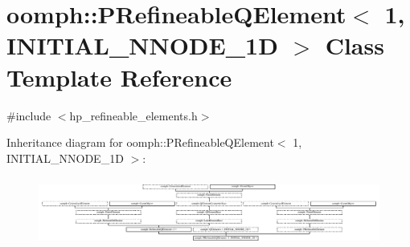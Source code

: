 \hypertarget{classoomph_1_1PRefineableQElement_3_011_00_01INITIAL__NNODE__1D_01_4}{}\section{oomph\+:\+:P\+Refineable\+Q\+Element$<$ 1, I\+N\+I\+T\+I\+A\+L\+\_\+\+N\+N\+O\+D\+E\+\_\+1D $>$ Class Template Reference}
\label{classoomph_1_1PRefineableQElement_3_011_00_01INITIAL__NNODE__1D_01_4}


{\ttfamily \#include $<$hp\+\_\+refineable\+\_\+elements.\+h$>$}

Inheritance diagram for oomph\+:\+:P\+Refineable\+Q\+Element$<$ 1, I\+N\+I\+T\+I\+A\+L\+\_\+\+N\+N\+O\+D\+E\+\_\+1D $>$\+:\begin{figure}[H]
\begin{center}
\leavevmode
\includegraphics[height=2.299120cm]{classoomph_1_1PRefineableQElement_3_011_00_01INITIAL__NNODE__1D_01_4}
\end{center}
\end{figure}

